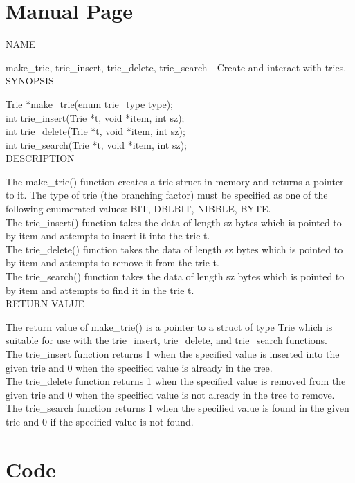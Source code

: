 \documentclass{llncs}
\begin{document}
\section{Manual Page}
\noindent NAME

make\_trie, trie\_insert, trie\_delete, trie\_search - Create and interact with tries.\\

\noindent SYNOPSIS

Trie *make\_trie(enum trie\_type type);\\
\indent int trie\_insert(Trie *t, void *item, int sz);\\
\indent int trie\_delete(Trie *t, void *item, int sz);\\
\indent int trie\_search(Trie *t, void *item, int sz);\\

\noindent DESCRIPTION

\noindent The make\_trie() function creates a trie struct in memory and returns a pointer to it. The type of trie (the branching factor) must be specified as one of the following enumerated values: BIT, DBLBIT, NIBBLE, BYTE.\\
The trie\_insert() function takes the data of length sz bytes which is pointed to by item and attempts to insert it into the trie t.\\
The trie\_delete() function takes the data of length sz bytes which is pointed to by item and attempts to remove it from the trie t.\\
The trie\_search() function takes the data of length sz bytes which is pointed to by item and attempts to find it in the trie t.\\

\noindent RETURN VALUE

\noindent The return value of make\_trie() is a pointer to a struct of type Trie which is suitable for use with the trie\_insert, trie\_delete, and trie\_search functions.\\
The trie\_insert function returns 1 when the specified value is inserted into the given trie and 0 when the specified value is already in the tree.\\
The trie\_delete function returns 1 when the specified value is removed from the given trie and 0 when the specified value is not already in the tree to remove.\\
The trie\_search function returns 1 when the specified value is found in the given trie and 0 if the specified value is not found.\\

\newpage
\section{Code}

\newpage

\end{document}

